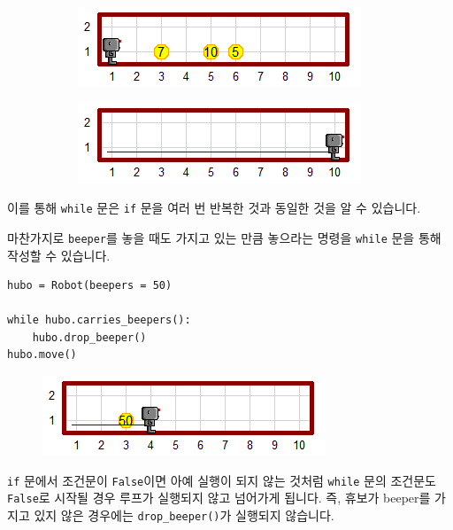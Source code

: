 \documentclass[../main.tex]{subfiles}
\begin{document}
\begin{figure}[H]
\centering
\begin{subfigure}{.5\textwidth}
\centering
\includegraphics[width=.9\linewidth]{"./lectures/lecture5_whilepickbeeper"}
\label{fig:lecture5whilepickbeeper}
\end{subfigure}%
\begin{subfigure}{.5\textwidth}
\centering
\includegraphics[width=.9\linewidth]{"./lectures/lecture5_pickbeeperaft"}
\label{fig:lecture5pickbeeperaft3}
\end{subfigure}
\end{figure}
이를 통해 \texttt{while} 문은 \texttt{if} 문을 여러 번 반복한 것과 동일한 것을 알 수 있습니다.

마찬가지로 \texttt{beeper}를 놓을 때도 가지고 있는 만큼 놓으라는 명령을 \texttt{while} 문을 통해 작성할 수 있습니다.
\begin{verbatim}
hubo = Robot(beepers = 50)

while hubo.carries_beepers():
	hubo.drop_beeper()
hubo.move()
\end{verbatim}
\begin{figure}[H]
\centering
\includegraphics[width=0.5\linewidth]{"./lectures/lecture5_whiledropbeeper"}
\label{fig:lecture5whiledropbeeper}
\end{figure}
\texttt{if} 문에서 조건문이 \texttt{False}이면 아예 실행이 되지 않는 것처럼 \texttt{while} 문의 조건문도 \texttt{False}로 시작될 경우 루프가 실행되지 않고 넘어가게 됩니다.
즉, 휴보가 beeper를 가지고 있지 않은 경우에는 \texttt{drop\_beeper()}가 실행되지 않습니다.
\end{document}

